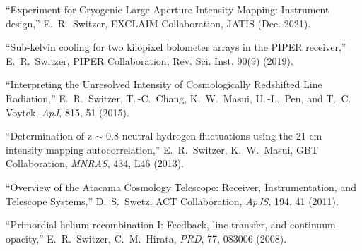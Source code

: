 \item ``Experiment for Cryogenic Large-Aperture Intensity Mapping: Instrument design,'' E.\ R.\ Switzer, EXCLAIM Collaboration, JATIS (Dec. 2021).
\item ``Sub-kelvin cooling for two kilopixel bolometer arrays in the PIPER receiver,'' E.\ R.\ Switzer, PIPER Collaboration, Rev. Sci. Inst. 90(9) (2019).
\item ``Interpreting the Unresolved Intensity of Cosmologically Redshifted Line Radiation,'' E.\, R.\, Switzer, T.\,-C.\, Chang, K.\, W.\, Masui, U.\,-L.\, Pen, and T.\, C.\, Voytek, {\it ApJ}, 815, 51 (2015).
\item ``Determination of z $\sim$ 0.8 neutral hydrogen fluctuations using the 21 cm intensity mapping autocorrelation,'' E.\, R.\, Switzer, K.\, W.\, Masui, GBT Collaboration, {\it MNRAS}, 434, L46 (2013).
\item ``Overview of the Atacama Cosmology Telescope: Receiver, Instrumentation, and Telescope Systems,'' D.\, S.\, Swetz, ACT Collaboration, {\it ApJS}, 194, 41 (2011).
\item ``Primordial helium recombination I: Feedback, line transfer, and continuum opacity,'' E.\, R.\, Switzer, C.\, M.\, Hirata, {\it PRD}, 77, 083006 (2008).
